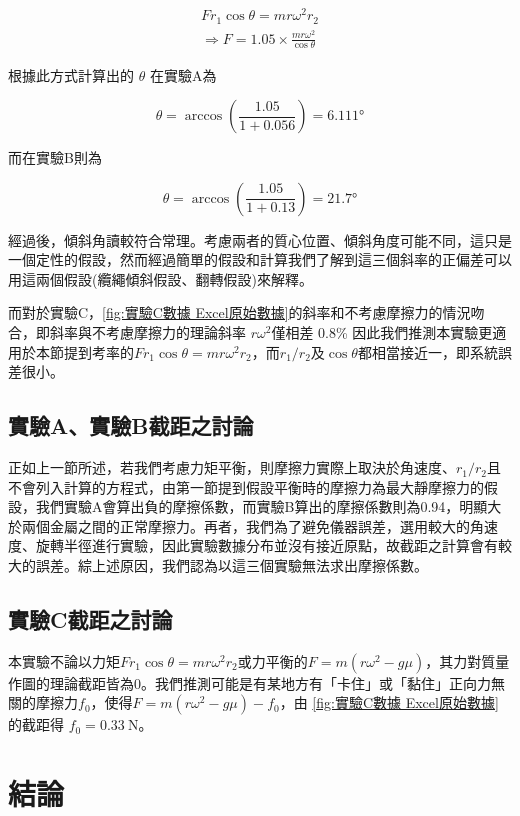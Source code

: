 \documentclass[11pt,a4paper]{article}
\theoremstyle{definition}
\begin{document}
            \begin{gather}
                F r_1 \cos{\theta} = mr\omega^2 r_2\\
                \Rightarrow F = 1.05 \times \frac{mr\omega^2}{\cos{\theta}}
            \end{gather}

            根據此方式計算出的 $\theta$ 在實驗A為

            \begin{equation}
               \theta = \arccos\left( \frac{1.05}{1 + 0.056} \right) = \ang{6.111}
            \end{equation}

            而在實驗B則為

            \begin{equation}
               \theta = \arccos\left( \frac{1.05}{1 + 0.13} \right) = \ang{21.7}
            \end{equation}

            經過後，傾斜角讀較符合常理。考慮兩者的質心位置、傾斜角度可能不同，這只是一個定性的假設，然而經過簡單的假設和計算我們了解到這三個斜率的正偏差可以用這兩個假設(纜繩傾斜假設、翻轉假設)來解釋。

            而對於實驗C，\autoref{fig:實驗C數據 Excel原始數據}的斜率和不考慮摩擦力的情況吻合，即斜率與不考慮摩擦力的理論斜率 $r\omega^2$僅相差 0.8\% 因此我們推測本實驗更適用於本節提到考率的$F r_1 \cos{\theta} = mr\omega^2 r_2$，而$r_1/r_2$及${\cos{\theta}}$都相當接近一，即系統誤差很小。

        \subsection{實驗A、實驗B截距之討論}

            正如上一節所述，若我們考慮力矩平衡，則摩擦力實際上取決於角速度、$r_1/r_2$且不會列入計算的方程式，由第一節提到假設平衡時的摩擦力為最大靜摩擦力的假設，我們實驗A會算出負的摩擦係數，而實驗B算出的摩擦係數則為0.94，明顯大於兩個金屬之間的正常摩擦力。再者，我們為了避免儀器誤差，選用較大的角速度、旋轉半徑進行實驗，因此實驗數據分布並沒有接近原點，故截距之計算會有較大的誤差。綜上述原因，我們認為以這三個實驗無法求出摩擦係數。

        \subsection{實驗C截距之討論}

            \par
            本實驗不論以力矩$F r_1 \cos{\theta} = mr\omega^2 r_2$或力平衡的$F = m(r\omega^2 - g \mu)$，其力對質量作圖的理論截距皆為0。我們推測可能是有某地方有「卡住」或「黏住」正向力無關的摩擦力$f_0$，使得$F = m(r\omega^2 - g \mu) - f_0$，由 \autoref{fig:實驗C數據 Excel原始數據} 的截距得 $f_0 = \SI{0.33}{\newton}$。
        
    \section{結論}


    \printbibliography
\end{document}
